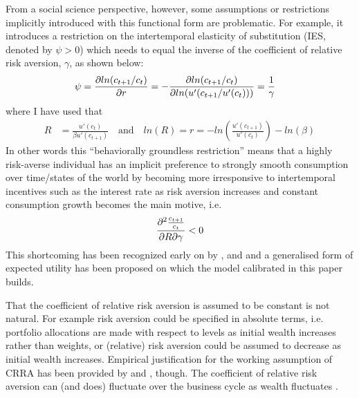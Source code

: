 From a social science perspective, however, some assumptions or restrictions implicitly introduced with this functional form are problematic. For example, it introduces a restriction on the intertemporal elasticity of substitution (IES, denoted by $\psi > 0$) which needs to equal the inverse of the coefficient of relative risk aversion, $\gamma$, as shown below:
\begin{align*}
    \psi &= \pdv{ln(c_{t+1}/c_{t})}{r} = -\pdv{ln(c_{t+1}/c_{t})}{ln(u'(c_{t+1} / u'(c_{t})))} = \frac{1}{\gamma}
\end{align*}
where I have used that
\begin{align*}
    R &= \frac{u'(c_{t})}{\beta u'(c_{t+1})} \quad \text{and} \quad ln(R) = r = -ln\left(\frac{u'(c_{t+1})}{u'(c_{t})}\right) - ln(\beta)
\end{align*}
In other words this ``behaviorally groundless restriction'' \cite{Weil1989} means that a highly risk-averse individual has an implicit preference to strongly smooth consumption over time/states of the world by becoming more irresponsive to intertemporal incentives such as the interest rate as risk aversion increases and constant consumption growth becomes the main motive, i.e.
\begin{align*}
    \pdv{\frac{c_{t+1}}{c_{t}}}{R}{\gamma} < 0
\end{align*}
This shortcoming has been recognized early on by \citet{Kreps1978}, \citet{Epstein1989} and \citet{Weil1989} and a generalised form of expected utility has been proposed on which the model calibrated in this paper builds. 

That the coefficient of relative risk aversion is assumed to be constant is not natural. For example risk aversion could be specified in absolute terms, i.e. portfolio allocations are made with respect to levels as initial wealth increases rather than weights, or (relative) risk aversion could be assumed to decrease as initial wealth increases. Empirical justification for the working assumption of CRRA has been provided by \citet{Brunnermeier2008} and \citet{Chiappori2011}, though. 
The coefficient of relative risk aversion can (and does) fluctuate over the business cycle as wealth fluctuates \cite{Brunnermeier2008, Gourio2012}.

